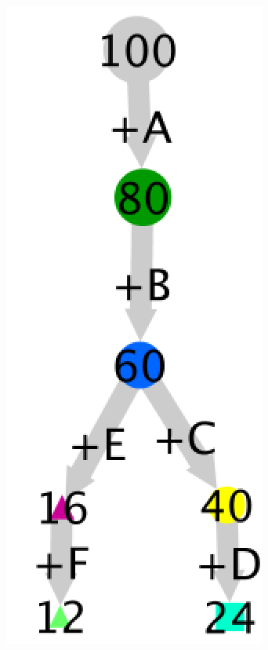 \documentclass{article}
\begin{document}
\begin{figure}[h]
\begin{subfigure}[t]{0.0452\linewidth}
		\caption{}
		\label{2}
	\end{subfigure}
	\hspace{0.07\linewidth}
	\begin{subfigure}[t]{0.11\linewidth}
		\centering
		\includegraphics[width = 1.0\linewidth, trim={0 0 0 0}, clip=true]{graph3.png}

\end{subfigure}
\end{figure}
\end{document}
